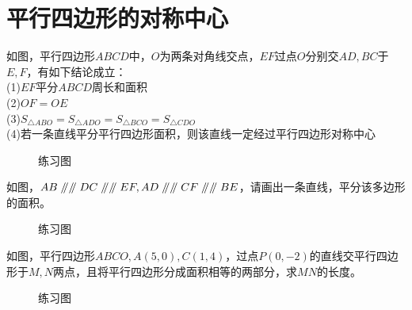 \section{平行四边形的对称中心}
\begin{definition}
    如图，平行四边形$ABCD$中，$O$为两条对角线交点，$EF$过点$O$分别交$AD,BC$于$E,F$，有如下结论成立：\\
    (1)$EF$平分$ABCD$周长和面积 \\
    (2)$OF=OE$ \\
    (3)$S_{\triangle ABO}=S_{\triangle ADO}=S_{\triangle BCO}=S_{\triangle CDO}$ \\
    (4)若一条直线平分平行四边形面积，则该直线一定经过平行四边形对称中心
\end{definition}
\begin{figure}[H]
    \centering
    \resizebox{4cm}{!}{}
    \caption{练习图}
\end{figure}
\begin{problem}
如图，$AB\px\px DC \px\px EF,AD\px\px CF\px\px BE$，请画出一条直线，平分该多边形的面积。
\end{problem}
\begin{figure}[H]
    \centering
    \resizebox{4cm}{!}{}
    \caption{练习图}
\end{figure}
\begin{problem}
如图，平行四边形$ABCO,A(5,0),C(1,4)$，过点$P(0,-2)$的直线交平行四边形于$M,N$两点，且将平行四边形分成面积相等的两部分，求$MN$的长度。
\end{problem}
\begin{figure}[H]
    \centering
    \resizebox{4cm}{!}{}
    \caption{练习图}
\end{figure}
\clearpage
